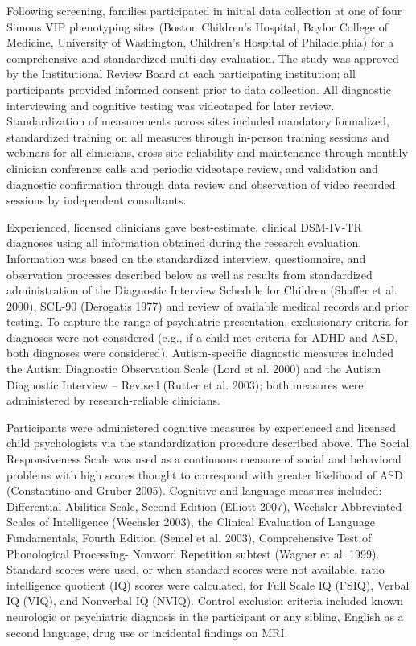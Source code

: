 \documentclass{article}
\begin{document}
\medskip

Following screening, families participated in initial data collection at one of four Simons VIP phenotyping sites (Boston Children’s Hospital, Baylor College of Medicine, University of Washington, Children’s Hospital of Philadelphia) for a comprehensive and standardized multi-day evaluation.  The study was approved by the Institutional Review Board at each participating institution; all participants provided informed consent prior to data collection. All diagnostic interviewing and cognitive testing was videotaped for later review. Standardization of measurements across sites included mandatory formalized, standardized training on all measures through in-person training sessions and webinars for all clinicians, cross-site reliability and maintenance through monthly clinician conference calls and periodic videotape review, and validation and diagnostic confirmation through data review and observation of video recorded sessions by independent consultants.  

\medskip

Experienced, licensed clinicians gave best-estimate, clinical DSM-IV-TR diagnoses using all information obtained during the research evaluation. Information was based on the standardized interview, questionnaire, and observation processes described below as well as results from standardized administration of the Diagnostic Interview Schedule for Children (Shaffer et al. 2000), SCL-90 (Derogatis 1977) and review of available medical records and prior testing. To capture the range of psychiatric presentation, exclusionary criteria for diagnoses were not considered (e.g., if a child met criteria for ADHD and ASD, both diagnoses were considered). Autism-specific diagnostic measures included the Autism Diagnostic Observation Scale (Lord et al. 2000) and the Autism Diagnostic Interview – Revised (Rutter et al. 2003); both measures were administered by research-reliable clinicians. 

\medskip

Participants were administered cognitive measures by experienced and licensed child psychologists via the standardization procedure described above.  The Social Responsiveness Scale was used as a continuous measure of social and behavioral problems with high scores thought to correspond with greater likelihood of ASD (Constantino and Gruber 2005).  Cognitive and language measures included: Differential Abilities Scale, Second Edition (Elliott 2007), Wechsler Abbreviated Scales of Intelligence (Wechsler 2003), the Clinical Evaluation of Language Fundamentals, Fourth Edition (Semel et al. 2003), Comprehensive Test of Phonological Processing- Nonword Repetition subtest (Wagner et al. 1999). Standard scores were used, or when standard scores were not available, ratio intelligence quotient (IQ) scores were calculated, for Full Scale IQ (FSIQ), Verbal IQ (VIQ), and Nonverbal IQ (NVIQ). Control exclusion criteria included known neurologic or psychiatric diagnosis in the participant or any sibling, English as a second language, drug use or incidental findings on MRI.  
\end{document}

